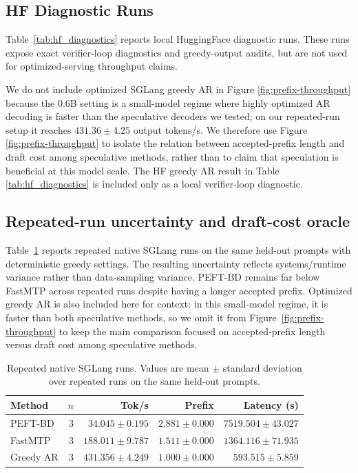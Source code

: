 \documentclass[11pt]{article}
\begin{document}
\subsection{HF Diagnostic Runs}
\label{app:hf_diagnostics}
Table~\ref{tab:hf_diagnostics} reports local HuggingFace diagnostic runs.
These runs expose exact verifier-loop diagnostics and greedy-output audits, but
are not used for optimized-serving throughput claims. 

We do not include optimized SGLang greedy AR in Figure \ref{fig:prefix-throughput} because the
0.6B setting is a small-model regime where highly optimized AR decoding
is faster than the speculative decoders we tested; on our repeated-run setup it reaches $431.36 \pm 4.25$ output tokens/s. We therefore use Figure \ref{fig:prefix-throughput} to isolate
the relation between accepted-prefix length and draft cost among
speculative methods, rather than to claim that speculation is beneficial
at this model scale. The HF greedy AR result in Table \ref{tab:hf_diagnostics} is included only
as a local verifier-loop diagnostic.

\subsection{Repeated-run uncertainty and draft-cost oracle}
\label{app:uncertainty-oracle}

Table~\ref{tab:uncertainty} reports repeated native SGLang runs on the same held-out prompts with deterministic greedy settings. The resulting uncertainty reflects systems/runtime variance rather than data-sampling variance. PEFT-BD remains far below FastMTP across repeated runs despite having a longer accepted prefix. Optimized greedy AR is also included here for context: in this small-model regime, it is faster than both speculative methods, so we omit it from Figure~\ref{fig:prefix-throughput} to keep the main comparison focused on accepted-prefix length versus draft cost among speculative methods.




\begin{table}[t]
\centering
\normalsize
\begin{tabular}{lrrrr}
\toprule
Method & $n$ & Tok/s & Prefix & Latency (s) \\
\midrule
PEFT-BD & 3 & $34.045 \pm 0.195$ & $2.881 \pm 0.000$ & $7519.504 \pm 43.027$ \\
FastMTP & 3 & $188.011 \pm 9.787$ & $1.511 \pm 0.000$ & $1364.116 \pm 71.935$ \\
Greedy AR & 3 & $431.356 \pm 4.249$ & $1.000 \pm 0.000$ & $593.515 \pm 5.859$ \\
\bottomrule
\end{tabular}
\caption{Repeated native SGLang runs. Values are mean $\pm$ standard deviation over repeated runs on the same held-out prompts.}
\label{tab:uncertainty}
\end{table}
\end{document}
